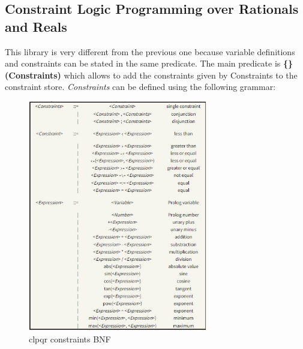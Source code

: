 \subsection{Constraint Logic Programming over Rationals and Reals}\label{subsec:clpqr}
This library is very different from the previous one because variable definitions and constraints can be stated in the same predicate. The main predicate is
\textbf{\{\}(Constraints)} which allows to add the constraints given by Constraints to the constraint store.\newline
\textit{Constraints} can be defined using the following grammar:

\begin{figure}[h]
    \centering
    \includegraphics[width=0.70\textwidth]{images/bnf_constraints.jpg}
    \caption{clpqr constraints BNF}
    \label{fig:bnf_constraints}
\end{figure}

